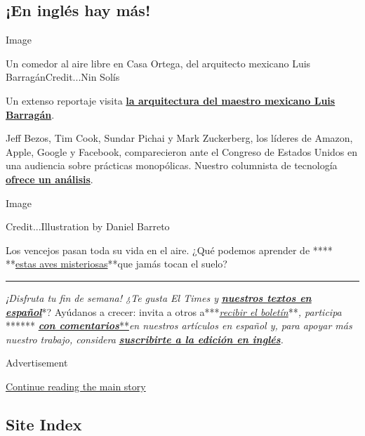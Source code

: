 \hypertarget{en-ingluxe9s-hay-muxe1s}{%
\subsection{¡En inglés hay más!}\label{en-ingluxe9s-hay-muxe1s}}

Image

Un comedor al aire libre en Casa Ortega, del arquitecto mexicano Luis
BarragánCredit...Nin Solís

Un extenso reportaje visita
\textbf{\href{https://www.nytimes.com/2020/07/24/t-magazine/luis-barragan.html}{la
arquitectura del maestro mexicano Luis Barragán}}.

Jeff Bezos, Tim Cook, Sundar Pichai y Mark Zuckerberg, los líderes de
Amazon, Apple, Google y Facebook, comparecieron ante el Congreso de
Estados Unidos en una audiencia sobre prácticas monopólicas. Nuestro
columnista de tecnología
\textbf{\href{https://www.nytimes.com/2020/07/30/technology/big-tech-ceos.html}{ofrece
un análisis}}.

Image

Credit...Illustration by Daniel Barreto

Los vencejos pasan toda su vida en el aire. ¿Qué podemos aprender de
****
**\href{https://www.nytimes.com/2020/07/29/magazine/vesper-flights.html}{estas
aves misteriosas}**que jamás tocan el suelo?

\begin{center}\rule{0.5\linewidth}{\linethickness}\end{center}

\emph{¡Disfruta tu fin de semana! ¿Te gusta El Times y}
\textbf{\href{https://www.nytimes.com/es/}{\emph{nuestros textos en
español}}}*? Ayúdanos a crecer: invita a otros
a***\href{https://www.nytimes.com/newsletters/el-times}{\emph{recibir el
boletín}}**\emph{, participa} ******
\textbf{\href{http://nytimes.com//es/2020/07/28/espanol/regreso-a-clases-covid.html\#commentsContainer}{\emph{con
comentarios}}}\href{http://nytimes.com//es/2020/07/28/espanol/regreso-a-clases-covid.html\#commentsContainer}{**}\emph{en
nuestros artículos en español y, para apoyar más nuestro trabajo,
considera}
\textbf{\href{https://www.nytimes.com/subscription}{\emph{suscribirte a
la edición en inglés}}}\emph{.}

Advertisement

\protect\hyperlink{after-bottom}{Continue reading the main story}

\hypertarget{site-index}{%
\subsection{Site Index}\label{site-index}}

